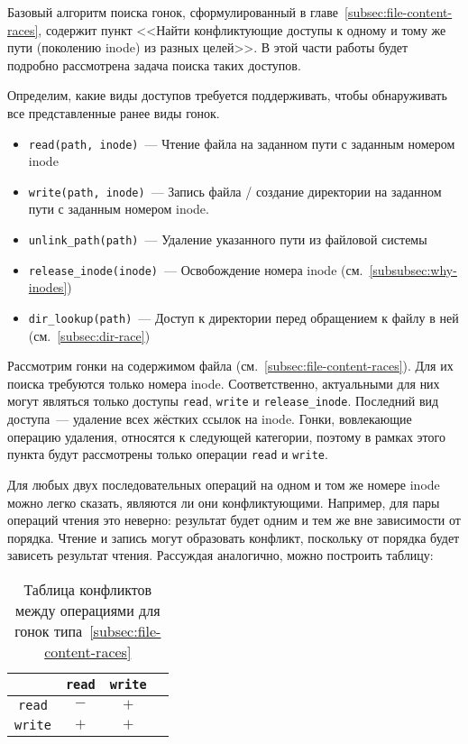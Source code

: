 Базовый алгоритм поиска гонок, сформулированный в главе~\ref{subsec:file-content-races}, содержит пункт <<Найти конфликтующие доступы к одному и тому же пути (поколению inode) из разных целей>>. В этой части работы будет подробно рассмотрена задача поиска таких доступов.

Определим, какие виды доступов требуется поддерживать, чтобы обнаруживать все представленные ранее виды гонок.

\begin{itemize}
    \item \texttt{read(path, inode)}~--- Чтение файла на заданном пути с заданным номером inode
    \item \texttt{write(path, inode)}~--- Запись файла / создание директории на заданном пути с заданным номером inode.
    \item \texttt{unlink\_path(path)}~--- Удаление указанного пути из файловой системы
    \item \texttt{release\_inode(inode)}~--- Освобождение номера inode (см.~\ref{subsubsec:why-inodes})
    \item \texttt{dir\_lookup(path)}~--- Доступ к директории перед обращением к файлу в ней (см.~\ref{subsec:dir-race})
\end{itemize}

Рассмотрим гонки на содержимом файла (см.~\ref{subsec:file-content-races}). Для их поиска требуются только номера inode. Соответственно, актуальными для них могут являться только доступы \texttt{read}, \texttt{write} и \texttt{release\_inode}. Последний вид доступа~--- удаление всех жёстких ссылок на inode. Гонки, вовлекающие операцию удаления, относятся к следующей категории, поэтому в рамках этого пункта будут рассмотрены только операции \texttt{read} и \texttt{write}.

Для любых двух последовательных операций на одном и том же номере inode можно легко сказать, являются ли они конфликтующими. Например, для пары операций чтения это неверно: результат будет одним и тем же вне зависимости от порядка. Чтение и запись могут образовать конфликт, поскольку от порядка будет зависеть результат чтения. Рассуждая аналогично, можно построить таблицу:

\begin{table}[H]
    \centering
    \begin{tabular}{cccc}
        \toprule
        & \texttt{read} & \texttt{write} \\
        \midrule
        \texttt{read} & $-$ & $+$ \\
        \texttt{write} & $+$ & $+$ \\
        \bottomrule
    \end{tabular}
    \caption{Таблица конфликтов между операциями для гонок типа~\ref{subsec:file-content-races}}
    \label{tab:conflict-table}
\end{table}

